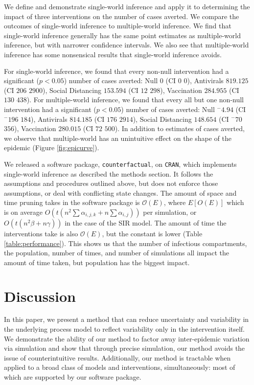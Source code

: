 \documentclass[PTRSB]{rsos}
\renewcommand{\neg}{{}^-}
\begin{document}
\begin{multicols}{2}
We define and demonstrate single-world inference and apply it to determining the impact of three interventions on the number of cases averted.
We compare the outcomes of single-world inference to multiple-world inference.
We find that single-world inference generally has the same point estimates as multiple-world inference, but with narrower confidence intervals.
We also see that multiple-world inference has some nonsensical results that single-world inference avoids.

For single-world inference, we found that every non-null intervention had a significant ($p<0.05$) number of cases averted: Null $ 0 $ (CI $ 0 $ \textemdash $ 0 $), Antivirals $ 819.125 $ (CI $ 206 $ \textemdash $ 2900 $), Social Distancing $ 153.594 $ (CI $ 12 $ \textemdash $ 298 $), Vaccination $ 284.955 $ (CI $ 130 $ \textemdash $ 438 $).
For multiple-world inference, we found that every all but one non-null intervention had a significant ($p<0.05$) number of cases averted: Null $ \neg4.94 $ (CI $ \neg196 $ \textemdash $ 184 $), Antivirals $ 814.185 $ (CI $ 176 $ \textemdash $ 2914 $), Social Distancing $ 148.654 $ (CI $ \neg70 $ \textemdash $ 356 $), Vaccination $ 280.015 $ (CI $ 72 $ \textemdash $ 500 $).
In addition to estimates of cases averted, we observe that multiple-world has an unintuitive effect on the shape of the epidemic (Figure \ref{fig:epicurve}).

We released a software package, \texttt{counterfactual}, on \texttt{CRAN}, %
which implements single-world inference as described the methods section.
It follows the assumptions and procedures outlined above, but does not enforce those assumptions, or deal with conflicting state changes.
The amount of space and time pruning takes in the software package is $\mathcal O(E)$, where $E[O(E)]$ which is on average $O(t(n^2\sum \alpha_{i,j,k} + n \sum\alpha_{i,j}))$ per simulation, or $O(t(n^2\beta + n\gamma))$ in the case of the SIR model.
The amount of time the interventions take is also $\mathcal O(E)$, but the constant is lower (Table \ref{table:performance}).
This shows us that the number of infectious compartments, the population, number of times, and number of simulations all impact the amount of time taken, but population has the biggest impact.

\section{Discussion}
In this paper, we present a method that can reduce uncertainty and variability in the underlying process model to reflect variability only in the intervention itself.
We demonstrate the ability of our method to factor away inter-epidemic variation via simulation and show that through precise simulation, our method avoids the issue of counterintuitive results. 
Additionally, our method is tractable when applied to a broad class of models and interventions, simultaneously: most of which are supported by our software package.


\end{multicols}
\end{document}
